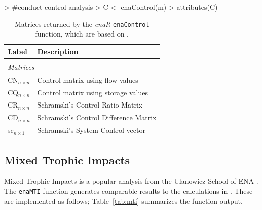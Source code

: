 \documentclass[article]{jss}
\begin{document}
\begin{Schunk}
\begin{Sinput}
>                                             #conduct control analysis
> C <- enaControl(m)
> attributes(C)
\end{Sinput}
\end{Schunk}
\begin{table}[t]
  \caption{Matrices returned by the \textit{enaR}
    \texttt{enaControl} function, which are based on
    \citep{dame81, patten81, schramski06, schramski07}.} \label{tab:control}
  \center
  \begin{small}
    \begin{tabular}{l p{10 cm}}
      \textbf{Label} & \textbf{Description} \\ \hline \\[-1.5ex]
      \multicolumn{2}{l}{\textit{Matrices}} \\[1ex]
      CN$_{n \times n}$ & Control matrix using flow values \\                       %
      CQ$_{n \times n}$ & Control matrix using storage values \\
      CR$_{n \times n}$ & Schramski's Control Ratio Matrix  \\            %
      CD$_{n \times n}$ & Schramski's Control Difference Matrix \\  %
      sc$_{n \times 1}$ & Schramski's System Control vector \\ \hline %
\end{tabular}
\end{small}
\end{table}


\subsection{Mixed Trophic Impacts}
Mixed Trophic Impacts is a popular analysis from the Ulanowicz School
of ENA \citep{ulanowicz90}.  The \texttt{enaMTI} function generates
comparable results to the calculations in \citet{ulanowicz90}.  These
are implemented as follows; Table~\ref{tab:mti} summarizes the
function output.
\end{document}
